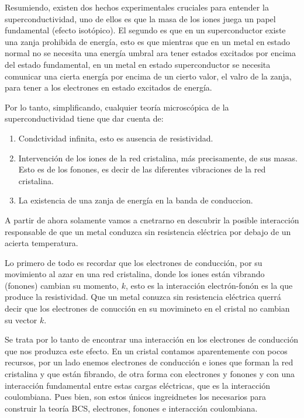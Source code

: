 Resumiendo, existen dos hechos experimentales cruciales para entender la superconductividad, uno de ellos es que la masa de los iones juega un papel fundamental (efecto isotópico). El segundo es que en un superconductor existe una zanja prohibida de energía, esto es que mientras que en un metal en estado normal no se necesita una energía umbral ara tener estados excitados por encima del estado fundamental, en un metal en estado superconductor se necesita comunicar una cierta energía por encima de un cierto valor, el valro de la zanja, para tener a los electrones en estado excitados de energía.

Por lo tanto, simplificando, cualquier teoría microscópica de la superconductividad tiene que dar cuenta de:

\begin{enumerate}
    \item Condctividad infinita, esto es ausencia de resistividad.
    \item Intervención de los iones de la red cristalina, más precisamente, de sus masas. Esto es de los fonones, es decir de las diferentes vibraciones de la red cristalina.
    \item La existencia de una zanja de energía en la banda de conduccion.
\end{enumerate}

A partir de ahora solamente vamos a cnetrarno en descubrir la posible interacción responsable de que un metal conduzca sin resistencia eléctrica por debajo de un acierta temperatura.

Lo primero de todo es recordar que los electrones de conducción, por su movimiento al azar en una red cristalina, donde los iones están vibrando (fonones) cambian su momento, $k$, esto es la interacción electrón-fonón es la que produce la resistividad. Que un metal conuzca sin resistencia eléctrica querrá decir que los electrones de conucción en su movimineto en el cristal no cambian su vector $k$.

Se trata por lo tanto de encontrar una interacción en los electrones de conducción que nos produzca este efecto. En un cristal contamos aparentemente con pocos recursos, por un lado enemos electrones de conducción e iones que forman la red cristalina y que están fibrando, de otra forma con electrones y fonones y con una interacción fundamental entre estas cargas eléctricas, que es la interacción coulombiana. Pues bien, son estos únicos ingreidnetes los necesarios para construir la teoría BCS, electrones, fonones e interacción coulombiana.

